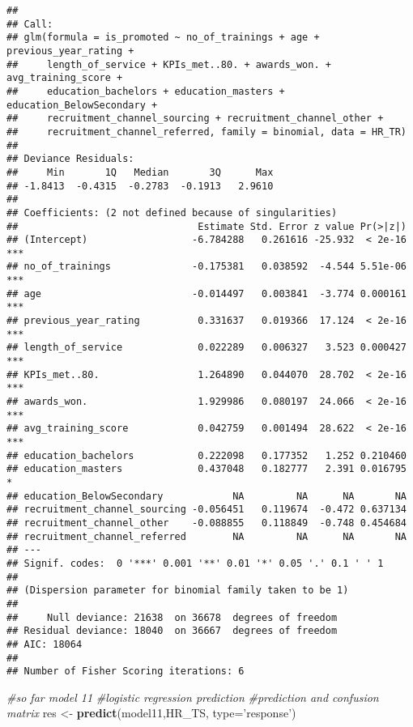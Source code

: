 \documentclass[
]{article}
\newenvironment{Shaded}{\begin{snugshade}}{\end{snugshade}}
\newcommand{\CommentTok}[1]{\textcolor[rgb]{0.56,0.35,0.01}{\textit{#1}}}
\newcommand{\DataTypeTok}[1]{\textcolor[rgb]{0.13,0.29,0.53}{#1}}
\newcommand{\KeywordTok}[1]{\textcolor[rgb]{0.13,0.29,0.53}{\textbf{#1}}}
\newcommand{\NormalTok}[1]{#1}
\newcommand{\StringTok}[1]{\textcolor[rgb]{0.31,0.60,0.02}{#1}}
\begin{document}
\begin{verbatim}
## 
## Call:
## glm(formula = is_promoted ~ no_of_trainings + age + previous_year_rating + 
##     length_of_service + KPIs_met..80. + awards_won. + avg_training_score + 
##     education_bachelors + education_masters + education_BelowSecondary + 
##     recruitment_channel_sourcing + recruitment_channel_other + 
##     recruitment_channel_referred, family = binomial, data = HR_TR)
## 
## Deviance Residuals: 
##     Min       1Q   Median       3Q      Max  
## -1.8413  -0.4315  -0.2783  -0.1913   2.9610  
## 
## Coefficients: (2 not defined because of singularities)
##                               Estimate Std. Error z value Pr(>|z|)    
## (Intercept)                  -6.784288   0.261616 -25.932  < 2e-16 ***
## no_of_trainings              -0.175381   0.038592  -4.544 5.51e-06 ***
## age                          -0.014497   0.003841  -3.774 0.000161 ***
## previous_year_rating          0.331637   0.019366  17.124  < 2e-16 ***
## length_of_service             0.022289   0.006327   3.523 0.000427 ***
## KPIs_met..80.                 1.264890   0.044070  28.702  < 2e-16 ***
## awards_won.                   1.929986   0.080197  24.066  < 2e-16 ***
## avg_training_score            0.042759   0.001494  28.622  < 2e-16 ***
## education_bachelors           0.222098   0.177352   1.252 0.210460    
## education_masters             0.437048   0.182777   2.391 0.016795 *  
## education_BelowSecondary            NA         NA      NA       NA    
## recruitment_channel_sourcing -0.056451   0.119674  -0.472 0.637134    
## recruitment_channel_other    -0.088855   0.118849  -0.748 0.454684    
## recruitment_channel_referred        NA         NA      NA       NA    
## ---
## Signif. codes:  0 '***' 0.001 '**' 0.01 '*' 0.05 '.' 0.1 ' ' 1
## 
## (Dispersion parameter for binomial family taken to be 1)
## 
##     Null deviance: 21638  on 36678  degrees of freedom
## Residual deviance: 18040  on 36667  degrees of freedom
## AIC: 18064
## 
## Number of Fisher Scoring iterations: 6
\end{verbatim}

\begin{Shaded}
\begin{Highlighting}[]
\CommentTok{#so far model 11}
\CommentTok{#logistic regression prediction}
\CommentTok{#prediction and confusion matrix}
\NormalTok{res <-}\StringTok{ }\KeywordTok{predict}\NormalTok{(model11,HR_TS, }\DataTypeTok{type=}\StringTok{'response'}\NormalTok{)}
\end{Highlighting}
\end{Shaded}
\end{document}
